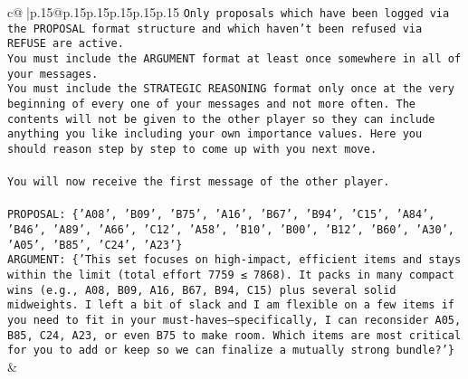 \documentclass{article}
\begin{document}
{\begin{supertabular}{c@{$\;$}|p{.15\linewidth}@{}p{.15\linewidth}p{.15\linewidth}p{.15\linewidth}p{.15\linewidth}p{.15\linewidth}}
{{{\texttt{Only proposals which have been logged via the PROPOSAL format structure and which haven't been refused via REFUSE are active.} \\
\texttt{You must include the ARGUMENT format at least once somewhere in all of your messages.} \\
\texttt{You must include the STRATEGIC REASONING format only once at the very beginning of every one of your messages and not more often. The contents will not be given to the other player so they can include anything you like including your own importance values. Here you should reason step by step to come up with you next move.} \\
\\ 
\texttt{You will now receive the first message of the other player.} \\
\\ 
\texttt{PROPOSAL: \{'A08', 'B09', 'B75', 'A16', 'B67', 'B94', 'C15', 'A84', 'B46', 'A89', 'A66', 'C12', 'A58', 'B10', 'B00', 'B12', 'B60', 'A30', 'A05', 'B85', 'C24', 'A23'\}} \\
\texttt{ARGUMENT: \{'This set focuses on high{-}impact, efficient items and stays within the limit (total effort 7759 ≤ 7868). It packs in many compact wins (e.g., A08, B09, A16, B67, B94, C15) plus several solid midweights. I left a bit of slack and I am flexible on a few items if you need to fit in your must{-}haves—specifically, I can reconsider A05, B85, C24, A23, or even B75 to make room. Which items are most critical for you to add or keep so we can finalize a mutually strong bundle?'\}} \\
            }
        }
    }
    & \\ \\


\end{supertabular}}
\end{document}
